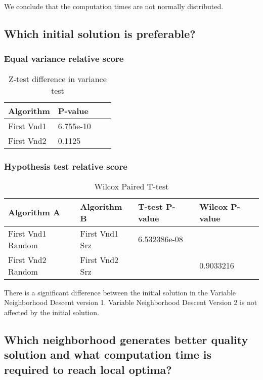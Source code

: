 \documentclass[]{article}
\begin{document}
	
	We conclude that the computation times are not normally distributed.
	
	\subsection{Which initial solution is preferable?}
	
	\subsubsection{Equal variance relative score}
	\begin{table}[H]
		\centering
		\caption{Z-test difference in variance test}
		\label{tab:table1}
		\begin{tabular}{l{|}lll}
			\toprule
			Algorithm & P-value\\
			\midrule
			First Vnd1 & \color{OliveGreen} 6.755e-10\\ 
			First Vnd2  &\color{Red}0.1125\\ 
			\bottomrule
		\end{tabular}
	\end{table}
	
	\subsubsection{Hypothesis test relative score}
	
	\begin{table}[H]
		\centering
		\caption{Wilcox Paired T-test }
		\label{tab:table1}
		\begin{tabular}{ll{|}ll}
			\toprule
			Algorithm A& Algorithm B & T-test P-value & Wilcox P-value\\
			\midrule
			First Vnd1 Random &First Vnd1 Srz&\color{OliveGreen}6.532386e-08&\\ 
			First Vnd2 Random  &First Vnd2 Srz&&\color{Red}0.9033216\\ 
			
			\bottomrule
		\end{tabular}
	\end{table}
	There is a significant difference between the initial solution in the Variable Neighborhood Descent version 1.
	Variable Neighborhood Descent Version 2 is not affected by the initial solution.
	
	
	\subsection{Which neighborhood generates better quality solution and what computation time is required to reach local optima?}
	
\end{document}
